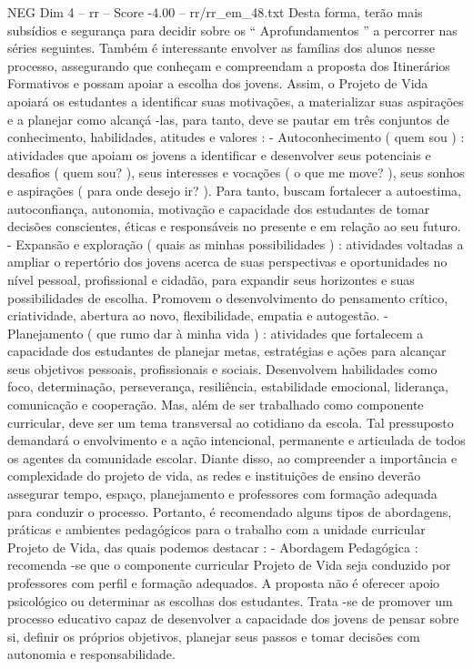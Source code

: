 \begin{textsample}{NEG Dim 4 – rr – Score -4.00 – rr/rr\_em\_48.txt}
Desta forma, terão mais subsídios e segurança para decidir sobre os “ Aprofundamentos ” a percorrer nas séries seguintes.
Também é interessante envolver as famílias dos alunos nesse processo, assegurando que conheçam e compreendam a proposta dos Itinerários Formativos e possam apoiar a escolha dos jovens.
Assim, o Projeto de Vida apoiará os estudantes a identificar suas motivações, a materializar suas aspirações e a planejar como alcançá -las, para tanto, deve se pautar em três conjuntos de conhecimento, habilidades, atitudes e valores : - Autoconhecimento ( quem sou ) : atividades que apoiam os jovens a identificar e desenvolver seus potenciais e desafios ( quem sou? ), seus interesses e vocações ( o que me move? ), seus sonhos e aspirações ( para onde desejo ir? ).
Para tanto, buscam fortalecer a autoestima, autoconfiança, autonomia, motivação e capacidade dos estudantes de tomar decisões conscientes, éticas e responsáveis no presente e em relação ao seu futuro. - Expansão e exploração ( quais as minhas possibilidades ) : atividades voltadas a ampliar o repertório dos jovens acerca de suas perspectivas e oportunidades no nível pessoal, profissional e cidadão, para expandir seus horizontes e suas possibilidades de escolha.
Promovem o desenvolvimento do pensamento crítico, criatividade, abertura ao novo, flexibilidade, empatia e autogestão. - Planejamento ( que rumo dar à minha vida ) : atividades que fortalecem a capacidade dos estudantes de planejar metas, estratégias e ações para alcançar seus objetivos pessoais, profissionais e sociais.
Desenvolvem habilidades como foco, determinação, perseverança, resiliência, estabilidade emocional, liderança, comunicação e cooperação.
Mas, além de ser trabalhado como componente curricular, deve ser um tema transversal ao cotidiano da escola.
Tal pressuposto demandará o envolvimento e a ação intencional, permanente e articulada de todos os agentes da comunidade escolar.
Diante disso, ao compreender a importância e complexidade do projeto de vida, as redes e instituições de ensino deverão assegurar tempo, espaço, planejamento e professores com formação adequada para conduzir o processo.
Portanto, é recomendado alguns tipos de abordagens, práticas e ambientes pedagógicos para o trabalho com a unidade curricular Projeto de Vida, das quais podemos destacar : - Abordagem Pedagógica : recomenda -se que o componente curricular Projeto de Vida seja conduzido por professores com perfil e formação adequados.
A proposta não é oferecer apoio psicológico ou determinar as escolhas dos estudantes.
Trata -se de promover um processo educativo capaz de desenvolver a capacidade dos jovens de pensar sobre si, definir os próprios objetivos, planejar seus passos e tomar decisões com autonomia e responsabilidade.

\end{textsample}
